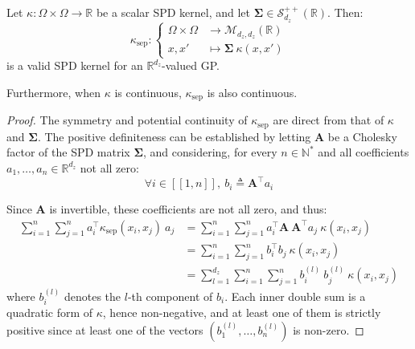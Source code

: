 \begin{proposition}\label{th:separable_kernel}
	Let $\kappa:\Omega\times\Omega\to\mathbb{R}$ be a scalar SPD kernel, and let $\boldsymbol{\Sigma}\in\mathcal{S}_{d_z}^{++}(\mathbb{R})$. Then:
	\begin{equation}
		\kappa_{\mathrm{sep}}:\left\{\begin{aligned}
		\Omega\times\Omega&\to\mathcal{M}_{d_z,d_z}(\mathbb{R})\\
		x,x'&\mapsto\boldsymbol{\Sigma}\:\kappa(x,x')
		\end{aligned}\right.
	\end{equation}
	is a valid SPD kernel for an $\mathbb{R}^{d_z}$-valued GP.

	Furthermore, when $\kappa$ is continuous, $\kappa_{\mathrm{sep}}$ is also continuous.
\end{proposition}

\begin{proof}
	The symmetry and potential continuity of $\kappa_{\mathrm{sep}}$ are direct from that of $\kappa$ and $\boldsymbol{\Sigma}$. The positive definiteness can be established by letting $\mathbf{A}$ be a Cholesky factor of the SPD matrix $\boldsymbol{\Sigma}$, and considering, for every $n\in\mathbb{N}^*$ and all coefficients $a_1,\dots,a_n\in\mathbb{R}^{d_z}$ not all zero:
	\begin{equation}
		\forall i\in[\![1,n]\!],\:b_i\triangleq \mathbf{A}^\top a_i
	\end{equation}

	Since $\mathbf{A}$ is invertible, these coefficients are not all zero, and thus:
	\begin{equation}
		\begin{aligned}
		\sum_{i=1}^n\sum_{j=1}^na_i^\top \kappa_{\mathrm{sep}}(x_i,x_j)\:a_j&=\sum_{i=1}^n\sum_{j=1}^na_i^\top \mathbf{A}\:\mathbf{A}^\top a_j\:\kappa(x_i,x_j)\\
		&=\sum_{i=1}^n\sum_{j=1}^nb_i^\top b_j\:\kappa(x_i,x_j)\\
		&=\sum_{l=1}^{d_z}\sum_{i=1}^n\sum_{j=1}^nb_i^{(l)}\:b_j^{(l)}\:\kappa(x_i,x_j)
		\end{aligned}
	\end{equation}
	where $b_i^{(l)}$ denotes the $l$-th component of $b_i$. Each inner double sum is a quadratic form of $\kappa$, hence non-negative, and at least one of them is strictly positive since at least one of the vectors $\left(b_1^{(l)},\dots,b_n^{(l)}\right)$ is non-zero.
\end{proof}

